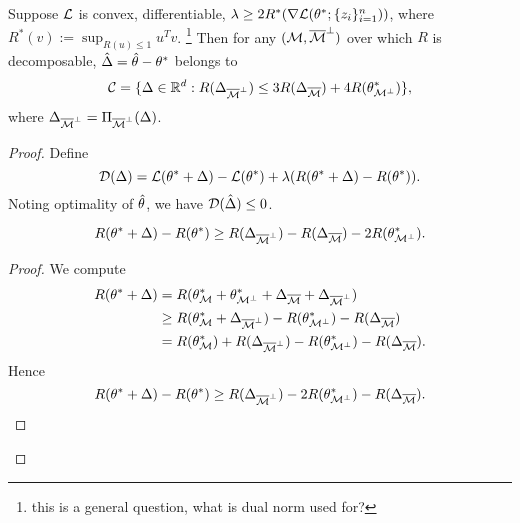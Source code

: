 \begin{pro} Suppose $\mathcal{L}$ is convex, differentiable,
    $\lambda\ge 2R^*(\nabla\mathcal{L}(\theta^*;\{z_i\}_{i=1}^n))$,
    where $R^*(v):=\sup_{R(u)\le 1}u^T v$.
    \footnote{this is a general question, what is dual norm used for?}
    Then for any $(\mathcal{M}, {\overline{\mathcal{M}}}^\perp)$ over which $R$ is decomposable,
    ${\hat\Delta} = {\hat{\theta}} - \theta^*$ belongs to
    \begin{equation}
        \mathcal{C}=\{\Delta\in{\mathbb{R}}^d:R(\Delta_{{\overline{\mathcal{M}}}^\perp})\le 3 R(\Delta_{{\overline{\mathcal{M}}}}) + 4R(\theta^*_{\mathcal{M}^\perp})\},
    \end{equation}
    where $\Delta_{{\overline{\mathcal{M}}}^\perp}=\Pi_{{\overline{\mathcal{M}}}^\perp}(\Delta)$.
\end{pro}

\begin{proof}
    Define
    \begin{equation}
        \mathcal{D}(\Delta)=\mathcal{L}(\theta^*+\Delta)-\mathcal{L}(\theta^*)+\lambda(R(\theta^*+\Delta)-R(\theta^*)).
    \end{equation}
    Noting optimality of ${\hat{\theta}}$, we have $\mathcal{D}({\hat\Delta})\le0$.

    \begin{claim}
        \begin{equation}
            R(\theta^*+\Delta)-R(\theta^*) \ge R(\Delta_{{\overline{\mathcal{M}}}^\perp})-R(\Delta_{{\overline{\mathcal{M}}}})-2R(\theta^*_{\mathcal{M}^\perp}).
        \end{equation}
    \end{claim}

    \begin{proof}
        We compute
        \begin{equation}
            \begin{split}
                R(\theta^*+\Delta) & = R(\theta_{\mathcal{M}}^*+\theta^*_{\mathcal{M}^\perp}+\Delta_{{\overline{\mathcal{M}}}}+\Delta_{{\overline{\mathcal{M}}}^\perp}) \\
                    & \ge R(\theta_{\mathcal{M}}^*+\Delta_{{\overline{\mathcal{M}}}^\perp})-R(\theta^*_{\mathcal{M}^\perp}) - R(\Delta_{{\overline{\mathcal{M}}}})  \\
                    & = R(\theta_{\mathcal{M}}^*)+R(\Delta_{{\overline{\mathcal{M}}}^\perp})-R(\theta^*_{\mathcal{M}^\perp}) - R(\Delta_{{\overline{\mathcal{M}}}}).
            \end{split}
        \end{equation}
        Hence
        \begin{equation}
            R(\theta^*+\Delta) - R(\theta^*) \ge R(\Delta_{{\overline{\mathcal{M}}}^\perp})-2R(\theta^*_{\mathcal{M}^\perp}) - R(\Delta_{{\overline{\mathcal{M}}}}).
        \end{equation}
    \end{proof}


\end{proof}
